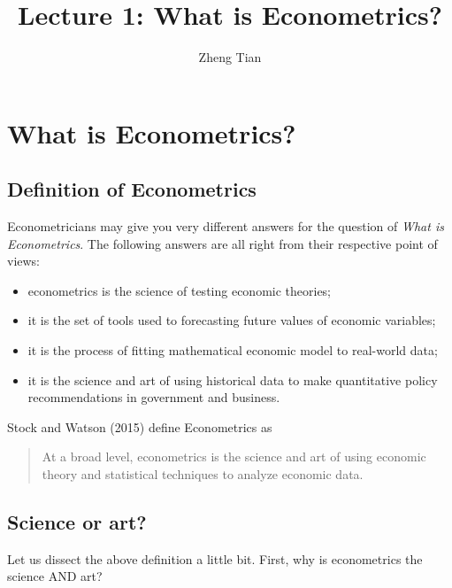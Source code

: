 \documentclass[a4paper,11pt]{article}
\author{Zheng Tian}
\date{}
\title{Lecture 1: What is Econometrics?}
\begin{document}
\maketitle
\setcounter{tocdepth}{1}
\tableofcontents


\section{What is Econometrics?}
\label{sec:org92a8322}

\subsection*{Definition of Econometrics}
\label{sec:orgbd4080a}

Econometricians may give you very different answers for the question
of \emph{What is Econometrics}. The following answers are all right from
their respective point of views:
\begin{itemize}
\item econometrics is the science of testing economic theories;
\item it is the set of tools used to forecasting future values
of economic variables;
\item it is the process of fitting mathematical economic model
to real-world data;
\item it is the science and art of using historical data to make
quantitative policy recommendations in government and business.
\end{itemize}

Stock and Watson (2015) define Econometrics as
\begin{quote}
At a broad level, econometrics is the science and art of using
economic theory and statistical techniques to analyze economic
data.
\end{quote}


\subsection*{Science or art?}
\label{sec:org22c764a}

Let us dissect the above definition a little bit. First, why is
econometrics the science AND art?
\end{document}
